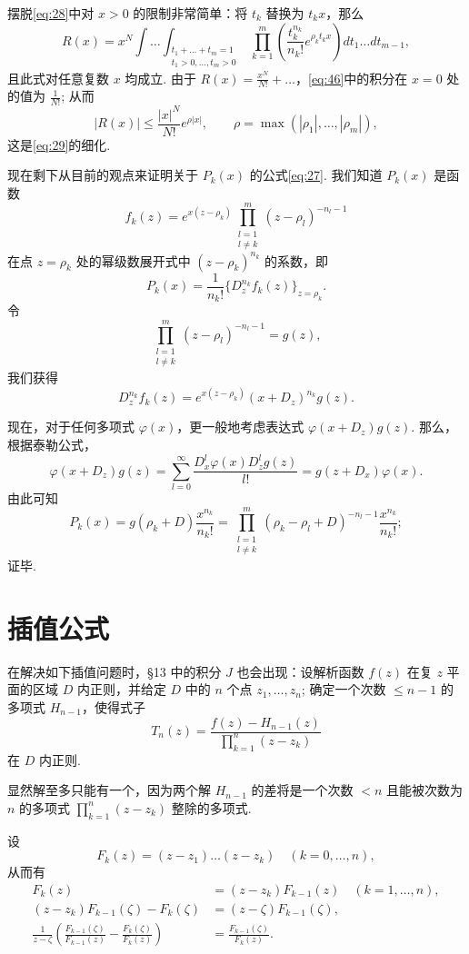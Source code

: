 摆脱\eqref{eq:28}中对 $x>0$ 的限制非常简单：将 $t_k$ 替换为 $t_k x$，那么
\begin{equation} R(x) = x^N \int \dots \int_{\substack{t_1 + \dots + t_m = 1 \\ t_1 > 0, \dots, t_m > 0}} \prod_{k=1}^{m} \left( \frac{t_k^{n_k}}{n_k!} e^{\rho_k t_k x} \right) dt_1 \dots dt_{m-1}, \tag{46}\label{eq:46} \end{equation}
且此式对任意复数 $x$ 均成立. 由于 $R(x) = \frac{x^N}{N!} + \dots$，\eqref{eq:46}中的积分在 $x=0$ 处的值为 $\frac{1}{N!}$; 从而
\[ |R(x)| \le \frac{|x|^N}{N!} e^{\rho|x|}, \qquad \rho = \max(|\rho_1|, \dots, |\rho_m|), \]
这是\eqref{eq:29}的细化.

现在剩下从目前的观点来证明关于 $P_k(x)$ 的公式\eqref{eq:27}. 我们知道 $P_k(x)$ 是函数
\[ f_k(z) = e^{x(z-\rho_k)} \prod_{\substack{l=1\\l\neq k}}^m (z-\rho_l)^{-n_l-1} \]
在点 $z=\rho_k$ 处的幂级数展开式中 $(z-\rho_k)^{n_k}$ 的系数，即
\[ P_k(x) = \frac{1}{n_k!} \{D_z^{n_k} f_k(z)\}_{z=\rho_k}. \]
令
\[ \prod_{\substack{l=1\\ l \neq k}}^{m} (z - \rho_l)^{-n_l-1} = g(z), \]
我们获得
\[ D_z^{n_k} f_k(z) = e^{x(z-\rho_k)} (x+D_z)^{n_k} g(z). \]

现在，对于任何多项式 $\varphi(x)$，更一般地考虑表达式 $\varphi(x+D_z)g(z)$. 那么，根据泰勒公式，
\[ \varphi(x+D_z)g(z) = \sum_{l=0}^{\infty} \frac{D_x^l \varphi(x) D_z^l g(z)}{l!} = g(z+D_x)\varphi(x). \]
由此可知
\[ P_k(x) = g(\rho_k+D) \frac{x^{n_k}}{n_k!} = \prod_{\substack{l=1\\l\neq k}}^{m} (\rho_k-\rho_l+D)^{-n_l-1} \frac{x^{n_k}}{n_k!}; \]
证毕.

\section{插值公式}

在解决如下插值问题时，\S 13 中的积分 $J$ 也会出现：设解析函数 $f(z)$ 在复 $z$ 平面的区域 $D$ 内正则，并给定 $D$ 中的 $n$ 个点 $z_1, \ldots, z_n$; 确定一个次数 $\leq n-1$ 的多项式 $H_{n-1}$，使得式子
\[ T_n(z) = \frac{f(z) - H_{n-1}(z)}{\prod_{k=1}^n (z - z_k)} \]
在 $D$ 内正则.

显然解至多只能有一个，因为两个解 $H_{n-1}$ 的差将是一个次数 $< n$ 且能被次数为 $n$ 的多项式 $\prod_{k=1}^n (z - z_k)$ 整除的多项式.

设
\[ F_k(z) = (z-z_1) \dots (z-z_k) \quad (k=0,\dots,n), \]
从而有
\begin{equation} \begin{aligned} F_k(z) &= (z-z_k)F_{k-1}(z) \quad (k=1,\dots,n), \\ (z-z_k)F_{k-1}(\zeta) - F_k(\zeta) &= (z-\zeta)F_{k-1}(\zeta), \\ \frac{1}{z-\zeta} \left( \frac{F_{k-1}(\zeta)}{F_{k-1}(z)} - \frac{F_k(\zeta)}{F_k(z)} \right) &= \frac{F_{k-1}(\zeta)}{F_k(z)}. \end{aligned} \tag{47}\label{eq:47} \end{equation}

